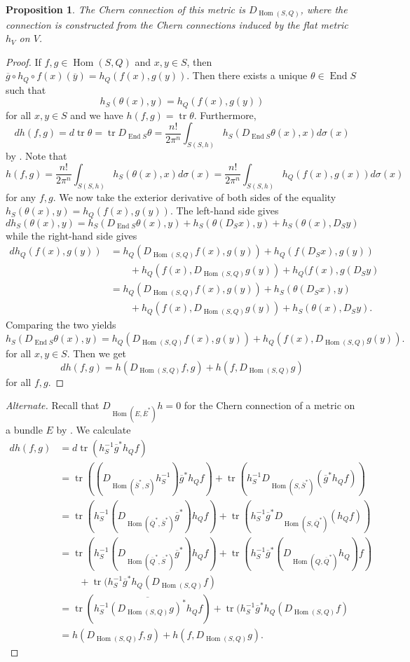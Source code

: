 \documentclass[11pt]{article}
\newtheorem{prop}[theo]{Proposition}
\newtheorem*{proof}{Proof}
\def\ov#1{\overline{#1}}
\DeclareMathOperator{\End}{End}
\DeclareMathOperator{\Hom}{Hom}
\DeclareMathOperator{\tr}{tr}
\begin{document}
\begin{prop}
The Chern connection of this metric is $D_{\Hom(S,Q)}$, where the connection is constructed from the Chern connections induced by the flat metric $h_V$ on $V$.
\end{prop}

\begin{proof}
If $f,g \in \Hom(S,Q)$ and $x, y \in S$, then $\ov g \circ h_Q \circ f(x)(\ov y) = h_Q(f(x), g(y))$. Then there exists a unique $\theta \in \End S$ such that
\[
h_S(\theta(x), y) = h_Q(f(x), g(y))
\]
for all $x,y \in S$
and we have $h(f, g) = \tr \theta$. Furthermore,
\[
d h(f, g)
= d \tr \theta
= \tr D_{\End S} \theta
= \frac{n!}{2\pi^n} \int_{S(S,h)} h_S(D_{\End S} \theta(x), x) d\sigma(x)
\]
by .
Note that
\[
h(f, g)
= \frac{n!}{2\pi^n} \int_{S(S,h)} h_S(\theta(x),x) d\sigma(x)
= \frac{n!}{2\pi^n} \int_{S(S,h)} h_Q(f(x),g(x)) d\sigma(x)
\]
for any $f, g$.
We now take the exterior derivative of both sides of the equality  $h_S(\theta(x), y) = h_Q(f(x), g(y))$.
The left-hand side gives
\[
d h_S(\theta(x), y)
= h_S(D_{\End S}\theta (x), y)
+ h_S(\theta(D_Sx), y)
+ h_S(\theta(x), D_S y)
\]
while the right-hand side gives
\begin{align*}
d h_Q(f(x), g(y))
&= h_Q(D_{\Hom(S,Q)}f (x), g(y))
+ h_Q(f(D_S x), g(y))
\\
&\qquad
{}+ h_Q(f(x), D_{\Hom(S,Q)} g(y))
+ h_Q(f(x), g(D_Sy)
\\
&= h_Q(D_{\Hom(S,Q)}f (x), g(y))
+ h_S(\theta(D_Sx), y)
\\
&\qquad
+ h_Q(f(x), D_{\Hom(S,Q)} g(y))
+ h_S(\theta(x), D_S y).
\end{align*}
Comparing the two yields
\[
h_S(D_{\End S} \theta(x), y)
= h_Q(D_{\Hom(S,Q)}f (x), g(y))
+ h_Q(f(x), D_{\Hom(S,Q)} g(y)).
\]
for all $x, y \in S$.
Then we get
\[
d h(f, g)
= h(D_{\Hom(S,Q)}f, g)
+ h(f, D_{\Hom(S,Q)} g)
\]
for all $f,g$.
\end{proof}


\begin{proof}[Alternate]
Recall that $D_{\Hom(E,\ov E^*)}h = 0$ for the Chern connection of a metric on a bundle $E$ by .
We calculate
\begin{align*}
d h(f,g)
&= d \tr(h_S^{-1} \ov g^* h_Q f)
\\
&= \tr((D_{\Hom(\ov S^*, S)} h_S^{-1})\ov g^* h_Q f)
+ \tr(h_S^{-1} D_{\Hom(S,\ov S^*)}(\ov g^* h_Q f))
\\
&= \tr(h_S^{-1} (D_{\Hom(\ov Q^*, \ov S^*)}\ov g^*)  h_Q f)
+ \tr(h_S^{-1} \ov g^* D_{\Hom(S,\ov Q^*)}( h_Q f))
\\
&= \tr(h_S^{-1} (D_{\Hom(\ov Q^*, \ov S^*)}\ov g^*)  h_Q f)
+ \tr(h_S^{-1} \ov g^* (D_{\Hom(Q,\ov Q^*)} h_Q) f)
\\
&\qquad
+ \tr(h_S^{-1} \ov g^*  h_Q (D_{\Hom(S,Q)} f)
\\
&= \tr(h_S^{-1} \ov{(D_{\Hom(S, Q)} g)^*}  h_Q f)
+ \tr(h_S^{-1} \ov g^*  h_Q (D_{\Hom(S,Q)} f)
\\
&= h(D_{\Hom(S,Q)} f, g) + h(f, D_{\Hom(S, Q)} g).
\end{align*}
\end{proof}
\end{document}

